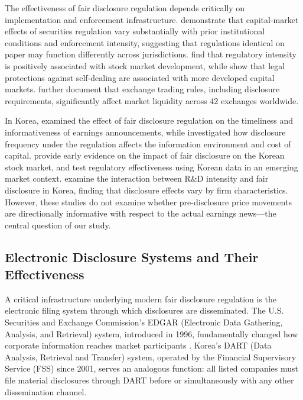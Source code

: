 \documentclass[manuscript,review]{acmart}
\begin{document}
The effectiveness of fair disclosure regulation depends critically on implementation and enforcement infrastructure. \citet{christensen2013capital} demonstrate that capital-market effects of securities regulation vary substantially with prior institutional conditions and enforcement intensity, suggesting that regulations identical on paper may function differently across jurisdictions. \citet{jackson2009regulatory} find that regulatory intensity is positively associated with stock market development, while \citet{djankov2008law} show that legal protections against self-dealing are associated with more developed capital markets. \citet{cumming2011exchange} further document that exchange trading rules, including disclosure requirements, significantly affect market liquidity across 42 exchanges worldwide.

In Korea, \citet{yun2012fair} examined the effect of fair disclosure regulation on the timeliness and informativeness of earnings announcements, while \citet{park2020disclosure} investigated how disclosure frequency under the regulation affects the information environment and cost of capital. \citet{yoon2011impact} provide early evidence on the impact of fair disclosure on the Korean stock market, and \citet{lee2012testing} test regulatory effectiveness using Korean data in an emerging market context. \citet{lee2019regulation} examine the interaction between R\&D intensity and fair disclosure in Korea, finding that disclosure effects vary by firm characteristics. However, these studies do not examine whether pre-disclosure price movements are directionally informative with respect to the actual earnings news---the central question of our study.

\subsection{Electronic Disclosure Systems and Their Effectiveness}

A critical infrastructure underlying modern fair disclosure regulation is the electronic filing system through which disclosures are disseminated. The U.S. Securities and Exchange Commission's EDGAR (Electronic Data Gathering, Analysis, and Retrieval) system, introduced in 1996, fundamentally changed how corporate information reaches market participants \cite{bushee2004economic}. Korea's DART (Data Analysis, Retrieval and Transfer) system, operated by the Financial Supervisory Service (FSS) since 2001, serves an analogous function: all listed companies must file material disclosures through DART before or simultaneously with any other dissemination channel.
\end{document}
